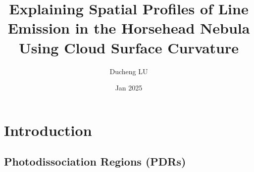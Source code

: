 \documentclass[10pt,dvipsnames,hyperref={colorlinks=false}]{beamer}
\title[Spherical Wrapper for \mdpdr{}]{Explaining Spatial Profiles of Line Emission in the Horsehead Nebula Using Cloud Surface Curvature}
\institute[Observatoire-PSL]{Observatoire-PSL}
\author{Ducheng LU}
\date{Jan 2025}
\newcommand{\qt}[1]{}
\begin{document}
\setlength{\abovedisplayskip}{3pt}
\setlength{\belowdisplayskip}{3pt}
\setlength{\abovedisplayshortskip}{3pt}
\setlength{\belowdisplayshortskip}{3pt}

\begin{frame}
    \titlepage
\end{frame}

\section{Introduction}
\subsection{Photodissociation Regions (PDRs)}
\end{document}
